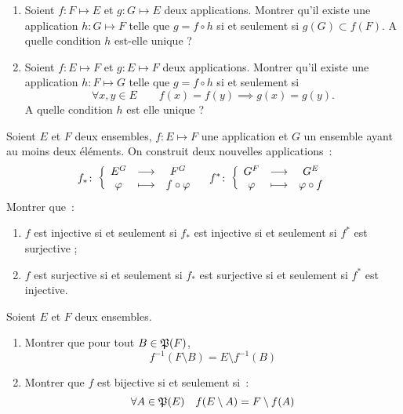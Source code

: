 \begin{exercice}
    \begin{enumerate}
        \item Soient \(f : F \longmapsto E\) et \(g : G \longmapsto E\) deux applications. Montrer qu'il existe une application \(h : G \longmapsto F\) telle que \(g = f \circ h\) si et seulement si \(g(G) \subset f(F)\). A quelle condition \(h\) est-elle unique ?
        \item Soient \(f : E \longmapsto F\) et \(g : E \longmapsto F\) deux applications. Montrer qu'il existe une application \(h : F \longmapsto G\) telle que \(g = f \circ h\) si et seulement si 
            \begin{equation}
                \forall x,y \in E \qquad f(x)=f(y) \implies g(x)=g(y).
            \end{equation}
        A quelle condition \(h\) est elle unique ?
    \end{enumerate}
\end{exercice}
\begin{exercice}
    Soient \(E\) et \(F\) deux ensembles, \(f : E \longmapsto F\) une application et \(G\) un ensemble ayant au moins deux éléments. On construit deux nouvelles applications~:
    \begin{equation}
        f_{*}\colon \left\{\begin{array}{ccc} E^G & \longrightarrow &F^G\\ \varphi & \longmapsto & f \circ \varphi \end{array} \right. \quad f^{*}\colon \left\{\begin{array}{ccc} G^F & \longrightarrow &G^E\\ \varphi & \longmapsto & \varphi \circ f \end{array} \right.
    \end{equation}
    Montrer que~:
    \begin{enumerate}
        \item \(f\) est injective si et seulement si \(f_{*}\) est injective si et seulement si \(f^{*}\) est surjective ;
        \item \(f\) est surjective si et seulement si \(f_{*}\) est surjective si et seulement si \(f^{*}\) est injective.
    \end{enumerate}
\end{exercice}
\begin{exercice}
    Soient \(E\) et \(F\) deux ensembles.
    \begin{enumerate}
        \item Montrer que pour tout \(B \in \mathfrak{P}(F)\),
            \begin{equation}
                f^{-1}(F\setminus B) = E \setminus f^{-1}(B)
            \end{equation}
        \item Montrer que \(f\) est bijective si et seulement si~:
            \begin{equation}
                \forall A \in \mathfrak{P}(E) \quad f(E\setminus A) = F\setminus f(A)
            \end{equation}
    \end{enumerate}
\end{exercice}

